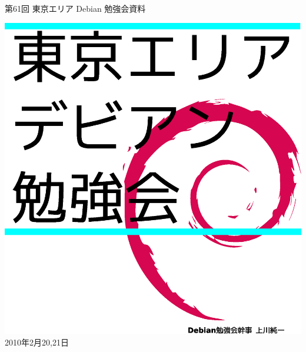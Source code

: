 \documentclass[mingoth,a4paper]{jsarticle}
\newcommand{\debmtgyear}{2010}
\newcommand{\debmtgmonth}{2}
\newcommand{\debmtgdate}{20,21}
\newcommand{\debmtgnumber}{61}
\begin{document}
\begin{titlepage}
\thispagestyle{empty}


\vspace*{-2cm}
第\debmtgnumber{}回 東京エリア Debian 勉強会資料

\hspace*{-2.4cm}
\includegraphics[width=210mm]{image200801/2008title.eps}\\
\hfill{}\debmtgyear{}年\debmtgmonth{}月\debmtgdate{}日

\end{titlepage}


\end{document}
